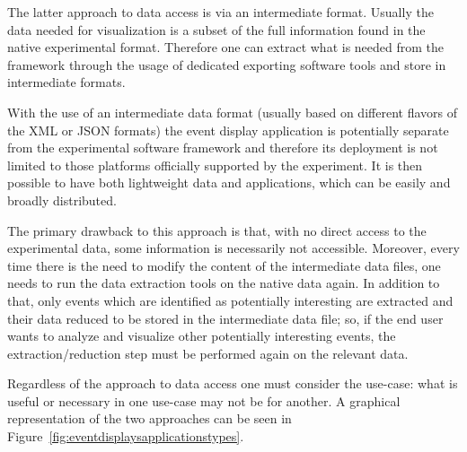 \documentclass[12pt,a4paper]{article}
\begin{document}
The latter approach to data access is via an intermediate format. Usually the data needed for visualization is a subset of the
full information found in the native experimental format. Therefore one can extract what is needed from the framework through
the usage of dedicated exporting software tools and store in intermediate formats.

With the use of an intermediate data format (usually based on different flavors of the XML or JSON formats) the event display
application is potentially separate from the experimental software framework and therefore its deployment is not limited to
those platforms officially supported by the experiment. It is then possible to have both lightweight data and applications,
which can be easily and broadly distributed. %

The primary drawback to this approach is that, with no direct access to the experimental data, some
information is necessarily not accessible. Moreover, every time there is the need to modify the content of the
intermediate data files, one needs to run the data extraction tools on the native data again.
In addition to that, only events which are identified as potentially interesting are extracted and their
data reduced to be stored in the intermediate data file; so, if the end user wants to analyze and visualize other
potentially interesting events, the extraction/reduction step must be performed again on the relevant data.

Regardless of the approach to data access one must consider the use-case: what is useful or necessary
in one use-case may not be for another. A graphical representation of the two approaches can be
seen in Figure~\ref{fig:eventdisplaysapplicationstypes}.
\end{document}

